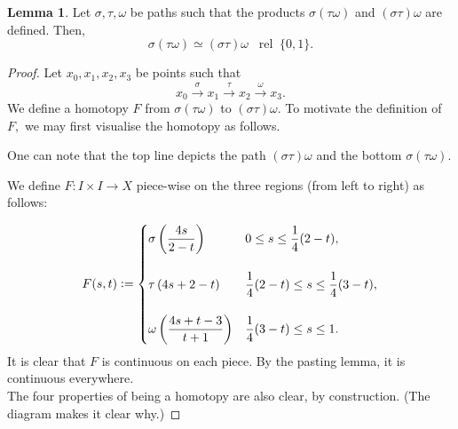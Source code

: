 \documentclass[12pt]{article}
\theoremstyle{definition}
\numberwithin{thm}{section}
\newtheorem{lem}[thm]{Lemma}
\newcommand{\rel}{\;\;\operatorname{rel}\;}
\begin{document}
\begin{lem} \label{lem:prodassoc}
	Let $\sigma, \tau, \omega$ be paths such that the products $\sigma(\tau\omega)$ and $(\sigma\tau)\omega$ are defined. Then,
	\begin{equation*} 
		\sigma(\tau\omega) \simeq (\sigma\tau)\omega \rel \{0, 1\}.
	\end{equation*}
\end{lem}
\begin{proof} 
	Let $x_0, x_1, x_2, x_3$ be points such that
	\begin{equation*} 
		x_0 \overset{\sigma}{\longrightarrow} x_1 \overset{\tau}{\longrightarrow} x_2 \overset{\omega}{\longrightarrow} x_3. 
	\end{equation*}
	We define a homotopy $F$ from $\sigma(\tau\omega)$ to $(\sigma\tau)\omega.$ To motivate the definition of $F,$ we may first visualise the homotopy as follows.
	\begin{center}
	\end{center}
	One can note that the top line depicts the path $(\sigma\tau)\omega$ and the bottom $\sigma(\tau\omega).$

	We define $F:I \times I \to X$ piece-wise on the three regions (from left to right) as follows:

	\begin{equation*} 
		F(s, t) \vcentcolon= \begin{cases}
			\sigma\left(\dfrac{4s}{2 - t}\right) & 0 \le s \le \dfrac{1}{4}(2 - t) ,\\~\\	\tau\left(4s + 2 - t\right) & \dfrac{1}{4}(2 - t) \le s \le \dfrac{1}{4}(3 - t),\\~\\
        	\omega\left(\dfrac{4s + t - 3}{t + 1}\right) & \dfrac{1}{4}(3 - t) \le s \le 1.
		\end{cases}
	\end{equation*}
	It is clear that $F$ is continuous on each piece. By the pasting lemma, it is continuous everywhere.\\
	The four properties of being a homotopy are also clear, by construction. (The diagram makes it clear why.)
\end{proof}
\end{document}
